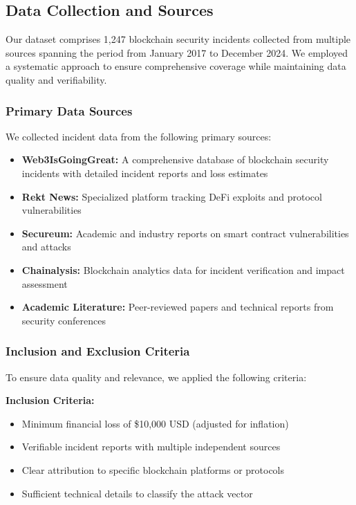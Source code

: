 \subsection{Data Collection and Sources}
\label{sec:data_collection}

Our dataset comprises 1,247 blockchain security incidents collected from multiple sources spanning the period from January 2017 to December 2024. We employed a systematic approach to ensure comprehensive coverage while maintaining data quality and verifiability.

\subsubsection{Primary Data Sources}
We collected incident data from the following primary sources:
\begin{itemize}
    \item \textbf{Web3IsGoingGreat:} A comprehensive database of blockchain security incidents with detailed incident reports and loss estimates
    \item \textbf{Rekt News:} Specialized platform tracking DeFi exploits and protocol vulnerabilities
    \item \textbf{Secureum:} Academic and industry reports on smart contract vulnerabilities and attacks
    \item \textbf{Chainalysis:} Blockchain analytics data for incident verification and impact assessment
    \item \textbf{Academic Literature:} Peer-reviewed papers and technical reports from security conferences
\end{itemize}

\subsubsection{Inclusion and Exclusion Criteria}
To ensure data quality and relevance, we applied the following criteria:

\textbf{Inclusion Criteria:}
\begin{itemize}
    \item Minimum financial loss of \$10,000 USD (adjusted for inflation)
    \item Verifiable incident reports with multiple independent sources
    \item Clear attribution to specific blockchain platforms or protocols
    \item Sufficient technical details to classify the attack vector
\end{itemize}

